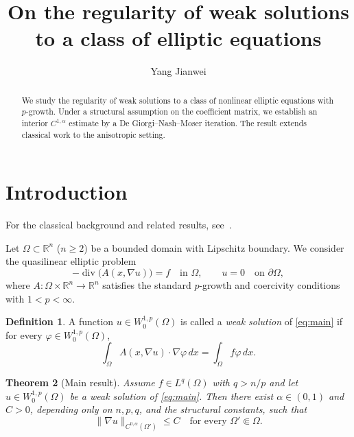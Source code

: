 \documentclass[11pt,reqno]{amsart}
\title[Short title]{On the regularity of weak solutions to a class of elliptic equations}
\author{Yang Jianwei}
\newtheorem{theorem}{Theorem}[section]
\theoremstyle{definition}
\newtheorem{definition}[theorem]{Definition}
\newcommand{\R}{\mathbb{R}}
\newcommand{\Om}{\Omega}
\begin{document}
\begin{abstract}
We study the regularity of weak solutions to a class of nonlinear elliptic
equations with $p$-growth. Under a structural assumption on the coefficient
matrix, we establish an interior $C^{1,\alpha}$ estimate by a De Giorgi--Nash--Moser
iteration. The result extends classical work to the anisotropic setting.
\end{abstract}

\maketitle

\section{Introduction}\label{sec:intro}
For the classical background and related results, see~\cite{GT,LU}.

Let $\Om\subset\R^n$ ($n\ge 2$) be a bounded domain with Lipschitz boundary.
We consider the quasilinear elliptic problem
\begin{equation}\label{eq:main}
  -\operatorname{div}\bigl(A(x,\nabla u)\bigr)=f \quad \text{in } \Om,
  \qquad u=0 \quad \text{on } \partial\Om ,
\end{equation}
where $A:\Om\times\R^n\to\R^n$ satisfies the standard $p$-growth and
coercivity conditions with $1<p<\infty$.

\begin{definition}\label{def:weak}
A function $u\in W^{1,p}_0(\Om)$ is called a \emph{weak solution} of
\eqref{eq:main} if for every $\varphi\in W^{1,p}_0(\Om)$,
\begin{equation}\label{eq:weak}
  \int_{\Om} A(x,\nabla u)\cdot\nabla\varphi\,dx
  = \int_{\Om} f\varphi\,dx .
\end{equation}
\end{definition}

\begin{theorem}[Main result]\label{thm:main}
Assume $f\in L^q(\Om)$ with $q>n/p$ and let $u\in W^{1,p}_0(\Om)$ be a weak
solution of \eqref{eq:main}. Then there exist $\alpha\in(0,1)$ and $C>0$,
depending only on $n,p,q$, and the structural constants, such that
\begin{equation}\label{eq:holder}
  \|\nabla u\|_{C^{0,\alpha}(\Om')} \le C
  \quad\text{for every } \Om'\Subset\Om .
\end{equation}
\end{theorem}
\end{document}
